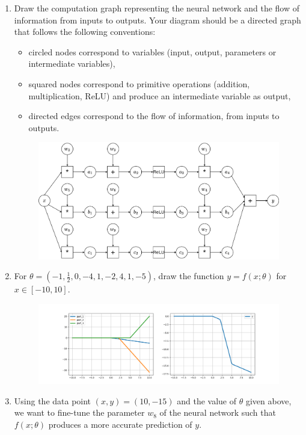 \documentclass[11pt, a4paper]{article}
\begin{document}
\begin{enumerate}
    \item Draw the computation graph representing the neural network and the flow of information from inputs to outputs. Your diagram should be a directed graph that follows the following conventions:
    \begin{itemize}
        \item circled nodes correspond to variables (input, output, parameters or intermediate variables),
        \item squared nodes correspond to primitive operations (addition, multiplication, ReLU) and produce an intermediate variable as output,
        \item directed edges correspond to the flow of information, from inputs to outputs.
    \end{itemize}

    \begin{solution}
        \begin{figure}[h!]
            \centering
            \includegraphics[width=\linewidth]{figures/examnet.png}
        \end{figure}
    \end{solution}
    
    \item For $\theta = (-1, \frac{1}{2}, 0, -4, 1, -2, 4, 1, -5)$, draw the function $y = f(x; \theta)$ for $x \in [-10, 10]$.

    \begin{solution}
        \begin{figure}[h!]
            \centering
            \includegraphics[width=\linewidth]{figures/relunet.png}
        \end{figure}
    \end{solution}
    \newpage
    \item Using the data point $(x, y) = (10, -15)$ and the value of $\theta$ given above, we want to fine-tune the parameter $w_8$ of the neural network such that $f(x; \theta)$ produces a more accurate prediction of $y$.


\end{enumerate}
\end{document}
